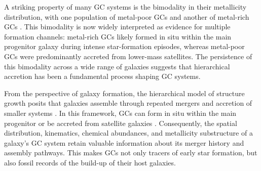     A striking property of many GC systems is the bimodality in their metallicity distribution, with one population of metal-poor GCs and another of metal-rich GCs \citep[e.g.,][]{2006ARA&A..44..193B, 2015ApJ...806...36H}. This bimodality is now widely interpreted as evidence for multiple formation channels: metal-rich GCs likely formed in situ within the main progenitor galaxy during intense star-formation episodes, whereas metal-poor GCs were predominantly accreted from lower-mass satellites. The persistence of this bimodality across a wide range of galaxies suggests that hierarchical accretion has been a fundamental process shaping GC systems.

    From the perspective of galaxy formation, the hierarchical model of structure growth posits that galaxies assemble through repeated mergers and accretion of smaller systems \citep{2015ARA&A..53...51S}. In this framework, GCs can form in situ within the main progenitor or be accreted from satellite galaxies \citep[e.g.,][]{2018MNRAS.479.4760F,2020MNRAS.498.2472K,2023A&A...673A..86P,2024MNRAS.528.3198B,2025A&A...693A.155P}. Consequently, the spatial distribution, kinematics, chemical abundances, and metallicity substructure of a galaxy's GC system retain valuable information about its merger history and assembly pathways. This makes GCs not only tracers of early star formation, but also fossil records of the build-up of their host galaxies.
    



